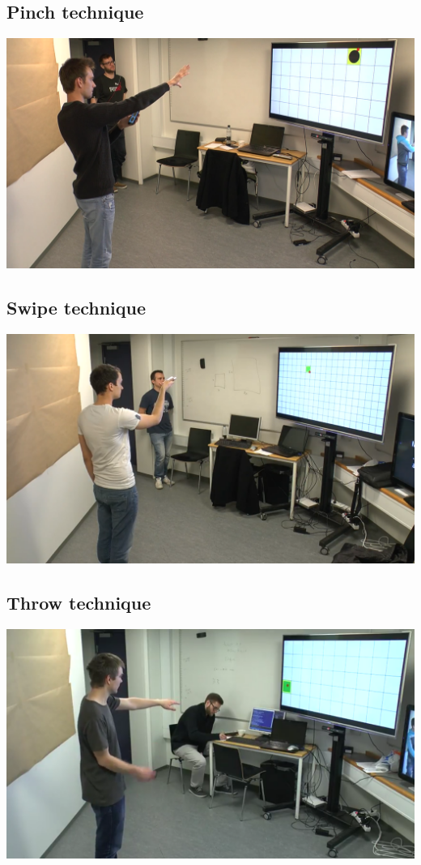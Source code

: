 \subsection*{Pinch technique}
\includegraphics[width=\textwidth]{images/steffen_pinch.png}

\subsection*{Swipe technique}
\includegraphics[width=\textwidth]{images/mathias_swipe.png}

\subsection*{Throw technique}
\includegraphics[width=\textwidth]{images/christian_throwing.png}

